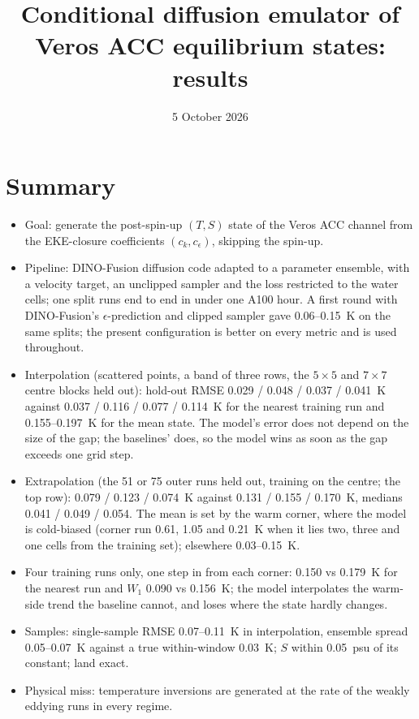 \documentclass[11pt,a4paper]{article}
\title{Conditional diffusion emulator of Veros ACC equilibrium states:\\results}
\author{}
\date{5 October 2026}
\begin{document}
\maketitle

\section*{Summary}
\begin{itemize}
  \item Goal: generate the post-spin-up $(T, S)$ state of the Veros ACC channel from the EKE-closure
        coefficients $(c_k, c_\epsilon)$, skipping the spin-up.
  \item Pipeline: DINO-Fusion diffusion code adapted to a parameter ensemble, with a velocity target, an
        unclipped sampler and the loss restricted to the water cells; one split runs end to end in under one
        A100 hour. A first round with DINO-Fusion's $\epsilon$-prediction and clipped sampler gave
        0.06--\SI{0.15}{K} on the same splits; the present configuration is better on every metric and is used
        throughout.
  \item Interpolation (scattered points, a band of three rows, the $5\times5$ and $7\times7$ centre blocks held
        out): hold-out RMSE 0.029 / 0.048 / 0.037 / \SI{0.041}{K} against 0.037 / 0.116 / 0.077 / \SI{0.114}{K}
        for the nearest training run and 0.155--\SI{0.197}{K} for the mean state. The model's error does not
        depend on the size of the gap; the baselines' does, so the model wins as soon as the gap exceeds one
        grid step.
  \item Extrapolation (the 51 or 75 outer runs held out, training on the centre; the top row): 0.079 / 0.123 /
        \SI{0.074}{K} against 0.131 / 0.155 / \SI{0.170}{K}, medians 0.041 / 0.049 / 0.054. The mean is set by the
        warm corner, where the model is cold-biased (corner run 0.61, 1.05 and \SI{0.21}{K} when it lies two,
        three and one cells from the training set); elsewhere 0.03--\SI{0.15}{K}.
  \item Four training runs only, one step in from each corner: 0.150 vs \SI{0.179}{K} for the nearest run and
        $W_1$ 0.090 vs \SI{0.156}{K}; the model interpolates the warm-side trend the baseline cannot, and loses
        where the state hardly changes.
  \item Samples: single-sample RMSE 0.07--\SI{0.11}{K} in interpolation, ensemble spread 0.05--\SI{0.07}{K} against
        a true within-window \SI{0.03}{K}; $S$ within \SI{0.05}{psu} of its constant; land exact.
  \item Physical miss: temperature inversions are generated at the rate of the weakly eddying runs in every
        regime.
\end{itemize}
\end{document}
